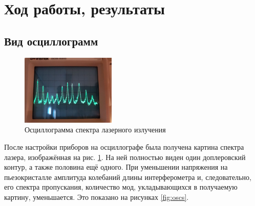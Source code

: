 \section{Ход работы, результаты}
\subsection{Вид осциллограмм}
\begin{figure}[h]
    \centering
    \includegraphics[width=0.4\textwidth]{oscar.jpg}
    \caption{Осциллограмма спектра лазерного излучения}
    \label{fig:oscar}
\end{figure}

После настройки приборов на осциллографе была получена картина спектра лазера, изображённая на рис. \ref{fig:oscar}. На ней полностью виден один доплеровский контур, а также половина ещё одного. При уменьшении напряжения на пьезокристалле амплитуда колебаний длины интерферометра и, следовательно, его спектра пропускания, количество мод, укладывающихся в получаемую картину, уменьшается. Это показано на рисунках \ref{fig:oscs}.
\newpage

